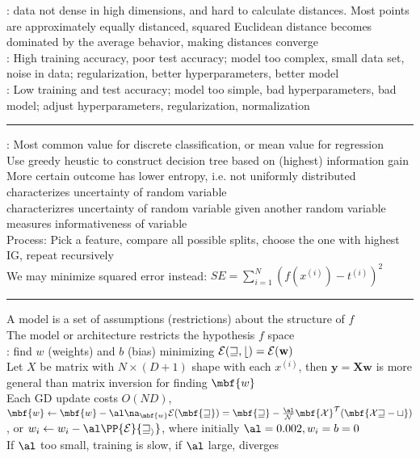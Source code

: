 \documentclass[10pt]{CheatSheet/hw}
\begin{document}
\begin{multicols*}{5}
: data not dense in high dimensions, and hard to calculate distances. Most points are approximately equally distanced, squared Euclidean distance becomes dominated by the average behavior, making distances converge\\
: High training accuracy, poor test accuracy; model too complex, small data set, noise in data; regularization, better hyperparameters, better model\\
: Low training and test accuracy; model too simple, bad hyperparameters, bad model; adjust hyperparameters, regularization, normalization\\
\rule{\linewidth}{0.4pt}
: Most common value for discrete classification, or mean value for regression\\
Use greedy heustic to construct decision tree based on (highest) information gain\\
More certain outcome has lower entropy, i.e. not uniformly distributed\\
 characterizes uncertainty of random variable\\
 characterizres uncertainty of random variable given another random variable\\
 measures informativeness of variable\\
Process: Pick a feature, compare all possible splits, choose the one with highest IG, repeat recursively\\
We may minimize squared error instead: $SE=\sum_{i=1}^N(f(x^{(i)})-t^{(i)})^2$\\
\rule{\linewidth}{0.4pt}
A model is a set of assumptions (restrictions) about the structure of $f$\\
The model or architecture restricts the hypothesis $f$ space\\
: find $w$ (weights) and $b$ (bias) minimizing $\cal{E}(w,b)=\cal{E}(\mathbf{w})$\\
Let $X$ be matrix with $N\times(D+1)$ shape with each $x^{(i)}$, then $\mathbf{y=Xw}$
 is more general than matrix inversion for finding $\mbf{w}$\\
Each GD update costs $O(ND)$, $\mbf{w}\gets \mbf{w}-\al\na_{\mbf{w}}\cal{E}(\mbf{w})=\mbf{w}-\frac{\al}{N}\mbf{X}^T(\mbf{Xw-t})$, or $w_i\gets w_i-\al\PP{\cal{E}}{w_i}$, where initially $\al=0.002, w_i=b=0$ \\
If $\al$ too small, training is slow, if $\al$ large, diverges\\

\end{multicols*}
\end{document}
